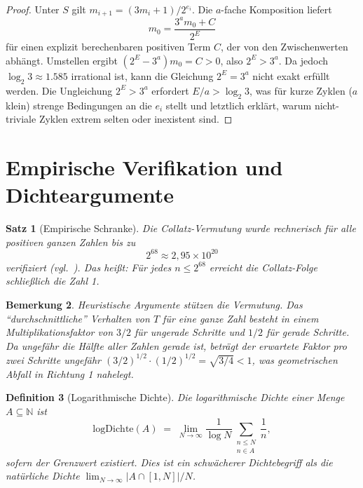 \documentclass[12pt,a4paper]{article}
\newtheorem{theorem}{Satz}[section]
\newtheorem{definition}[theorem]{Definition}
\newtheorem{remark}[theorem]{Bemerkung}
\begin{document}
\begin{proof}
Unter $S$ gilt $m_{i+1} = (3m_i + 1) / 2^{e_i}$. Die $a$-fache Komposition liefert
\[
  m_0 = \frac{3^a m_0 + C}{2^E}
\]
für einen explizit berechenbaren positiven Term $C$, der von den Zwischenwerten abhängt.
Umstellen ergibt $(2^E - 3^a) m_0 = C > 0$, also $2^E > 3^a$.
Da jedoch $\log_2 3 \approx 1.585$ irrational ist, kann die Gleichung $2^E = 3^a$ nicht
exakt erfüllt werden. Die Ungleichung $2^E > 3^a$ erfordert $E/a > \log_2 3$, was
für kurze Zyklen ($a$ klein) strenge Bedingungen an die $e_i$ stellt und letztlich
erklärt, warum nicht-triviale Zyklen extrem selten oder inexistent sind.
\end{proof}

\section{Empirische Verifikation und Dichteargumente}

\begin{theorem}[Empirische Schranke]\label{thm:empirical}
Die Collatz-Vermutung wurde rechnerisch für alle positiven ganzen Zahlen bis zu
\[
  2^{68} \approx 2{,}95 \times 10^{20}
\]
verifiziert (vgl.\ \cite{Barina2020}). Das heißt: Für jedes $n \leq 2^{68}$ erreicht
die Collatz-Folge schließlich die Zahl 1.
\end{theorem}

\begin{remark}\label{rem:heuristics}
Heuristische Argumente stützen die Vermutung. Das ``durchschnittliche'' Verhalten von $T$
für eine ganze Zahl besteht in einem Multiplikationsfaktor von $3/2$ für ungerade Schritte
und $1/2$ für gerade Schritte. Da ungefähr die Hälfte aller Zahlen gerade ist, beträgt
der erwartete Faktor pro zwei Schritte ungefähr $(3/2)^{1/2} \cdot (1/2)^{1/2} = \sqrt{3/4} < 1$,
was geometrischen Abfall in Richtung 1 nahelegt.
\end{remark}

\begin{definition}[Logarithmische Dichte]\label{def:logdens}
Die \emph{logarithmische Dichte} einer Menge $A \subseteq \mathbb{N}$ ist
\[
  \mathrm{logDichte}(A) \;=\; \lim_{N \to \infty} \frac{1}{\log N} \sum_{\substack{n \leq N \\ n \in A}} \frac{1}{n},
\]
sofern der Grenzwert existiert. Dies ist ein schwächerer Dichtebegriff als die
natürliche Dichte $\lim_{N\to\infty} |A \cap [1,N]|/N$.
\end{definition}
\end{document}

